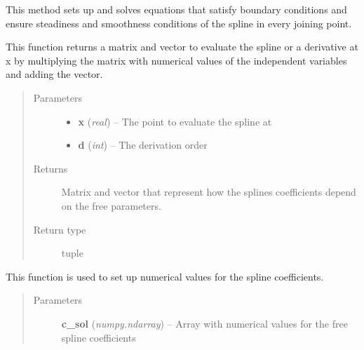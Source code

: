 \documentclass[letterpaper,10pt,english]{sphinxmanual}
\begin{document}
\begin{fulllineitems}
\begin{fulllineitems}
\end{fulllineitems}


\begin{fulllineitems}
\label{pytrajectory:pytrajectory.spline.CubicSpline.makesteady}
This method sets up and solves equations that satisfy boundary conditions and
ensure steadiness and smoothness conditions of the spline in every joining point.

\end{fulllineitems}


\begin{fulllineitems}
\label{pytrajectory:pytrajectory.spline.CubicSpline.prov_evalf}
This function returns a matrix and vector to evaluate the spline or a derivative at x
by multiplying the matrix with numerical values of the independent variables
and adding the vector.
\begin{quote}\begin{description}
\item[{Parameters}] \leavevmode\begin{itemize}
\item {} 
\textbf{x} (\emph{real}) -- The point to evaluate the spline at

\item {} 
\textbf{d} (\emph{int}) -- The derivation order

\end{itemize}

\item[{Returns}] \leavevmode
Matrix and vector that represent how the splines coefficients depend on the free parameters.

\item[{Return type}] \leavevmode
tuple

\end{description}\end{quote}

\end{fulllineitems}


\begin{fulllineitems}
\label{pytrajectory:pytrajectory.spline.CubicSpline.set_coeffs}
This function is used to set up numerical values for the spline coefficients.
\begin{quote}\begin{description}
\item[{Parameters}] \leavevmode
\textbf{c\_sol} (\emph{numpy.ndarray}) -- Array with numerical values for the free spline coefficients


\end{description}
\end{quote}
\end{fulllineitems}
\end{fulllineitems}
\end{document}
